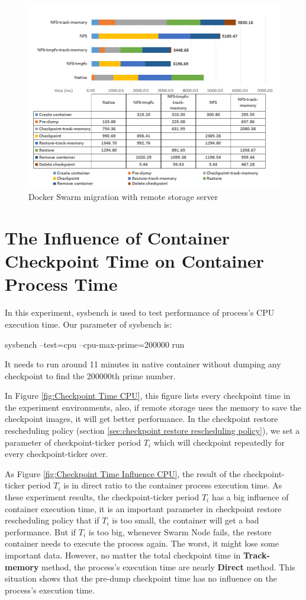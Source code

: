 \begin{figure}[hbtp]
\includegraphics[width=17cm]{figure/migration_time.png}
\caption{Docker Swarm migration with remote storage server}
\label{fig:Docker Swarm migration time with remote storage server}
\end{figure}

\section{The Influence of Container Checkpoint Time on Container Process Time}
\label{sec:CPU Time}
In this experiment, sysbench\cite{kopytov2004sysbench} is used to test performance of process's CPU execution time. Our parameter of sysbench is:
\begin{center}
sysbench --test=cpu --cpu-max-prime=200000 run
\end{center}
It needs to run around 11 minutes in native container without dumping any checkpoint to find the 200000th prime number.

In Figure \ref{fig:Checkpoint Time CPU}, this figure lists every checkpoint time in the experiment environments, also, if remote storage uses the memory to save the checkpoint images, it will get better performance.
In the checkpoint restore rescheduling policy (section \ref{sec:checkpoint restore rescheduling policy}), we set a parameter of checkpoint-ticker period $ T_i $ which will checkpoint repeatedly for every checkpoint-ticker over.

As Figure \ref{fig:Checkpoint Time Influence CPU}, the result of the checkpoint-ticker period $ T_i $ is in direct ratio to the container process execution time.
As these experiment results, the checkpoint-ticker period $ T_i $ has a big influence of container execution time, it is an important parameter in checkpoint restore rescheduling policy that if $ T_i $ is too small, the container will get a bad performance. But if $ T_i $ is too big, whenever Swarm Node fails, the restore container needs to execute the process again. The worst, it might lose some important data. However, no matter the total checkpoint time in \textbf{Track-memory} method, the process's execution time are nearly 
\textbf{Direct} method. This situation shows that the pre-dump checkpoint time has no influence on the process's execution time.

